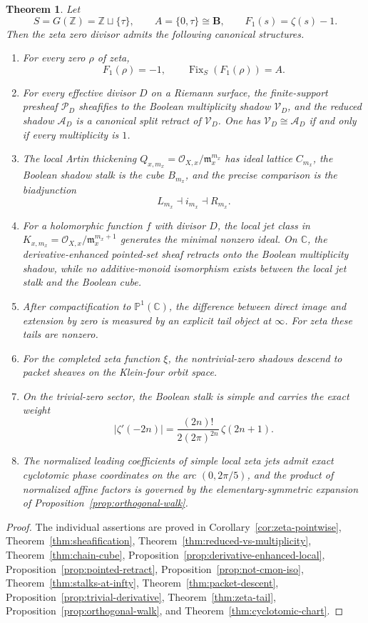 \documentclass[11pt,a4paper]{article}
\newtheorem{theorem}{Theorem}[section]
\theoremstyle{definition}
\theoremstyle{remark}
\DeclareMathOperator{\Fix}{Fix}
\newcommand{\ZZ}{\mathbb Z}
\newcommand{\CC}{\mathbb C}
\newcommand{\PP}{\mathbb P}
\newcommand{\BB}{\mathbf B}
\newcommand{\cO}{\mathcal O}
\newcommand{\cP}{\mathcal P}
\newcommand{\cV}{\mathcal V}
\newcommand{\cA}{\mathcal A}
\newcommand{\taup}{\tau}
\begin{document}
\begin{theorem}
Let
\[
S=G(\ZZ)=\ZZ\sqcup\{\taup\},\qquad A=\{0,\taup\}\cong\BB,
\qquad F_1(s)=\zeta(s)-1.
\]
Then the zeta zero divisor admits the following canonical structures.
\begin{enumerate}[label=(\roman*)]
\item For every zero $\rho$ of zeta,
\[
F_1(\rho)=-1,
\qquad
\Fix_S(F_1(\rho))=A.
\]
\item For every effective divisor $D$ on a Riemann surface, the finite-support presheaf $\cP_D$ sheafifies to the Boolean multiplicity shadow $\cV_D$, and the reduced shadow $\cA_D$ is a canonical split retract of $\cV_D$.  One has $\cV_D\cong\cA_D$ if and only if every multiplicity is $1$.
\item The local Artin thickening $Q_{x,m_x}=\cO_{X,x}/\mathfrak m_x^{m_x}$ has ideal lattice $C_{m_x}$, the Boolean shadow stalk is the cube $B_{m_x}$, and the precise comparison is the biadjunction
\[
L_{m_x}\dashv i_{m_x}\dashv R_{m_x}.
\]
\item For a holomorphic function $f$ with divisor $D$, the local jet class in $K_{x,m_x}=\cO_{X,x}/\mathfrak m_x^{m_x+1}$ generates the minimal nonzero ideal.  On $\CC$, the derivative-enhanced pointed-set sheaf retracts onto the Boolean multiplicity shadow, while no additive-monoid isomorphism exists between the local jet stalk and the Boolean cube.
\item After compactification to $\PP^1(\CC)$, the difference between direct image and extension by zero is measured by an explicit tail object at $\infty$.  For zeta these tails are nonzero.
\item For the completed zeta function $\xi$, the nontrivial-zero shadows descend to packet sheaves on the Klein-four orbit space.
\item On the trivial-zero sector, the Boolean stalk is simple and carries the exact weight
\[
|\zeta'(-2n)|=\frac{(2n)!}{2(2\pi)^{2n}}\,\zeta(2n+1).
\]
\item The normalized leading coefficients of simple local zeta jets admit exact cyclotomic phase coordinates on the arc $(0,2\pi/5)$, and the product of normalized affine factors is governed by the elementary-symmetric expansion of Proposition~\ref{prop:orthogonal-walk}.
\end{enumerate}
\end{theorem}

\begin{proof}
The individual assertions are proved in Corollary~\ref{cor:zeta-pointwise}, Theorem~\ref{thm:sheafification}, Theorem~\ref{thm:reduced-vs-multiplicity}, Theorem~\ref{thm:chain-cube}, Proposition~\ref{prop:derivative-enhanced-local}, Proposition~\ref{prop:pointed-retract}, Proposition~\ref{prop:not-cmon-iso}, Theorem~\ref{thm:stalks-at-infty}, Theorem~\ref{thm:packet-descent}, Proposition~\ref{prop:trivial-derivative}, Theorem~\ref{thm:zeta-tail}, Proposition~\ref{prop:orthogonal-walk}, and Theorem~\ref{thm:cyclotomic-chart}.
\end{proof}
\end{document}
